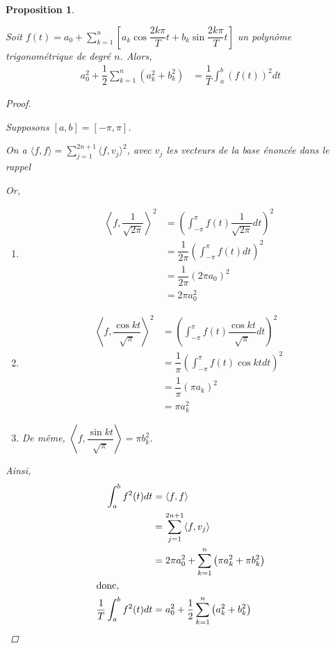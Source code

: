 \documentclass{report}
\newcommand*{\dsum}[4]{\displaystyle\sum_{#1=#2}^{#3}#4}
\newcommand*{\dint}[3]{\displaystyle\int_{#1}^{#2}#3}
\newtheorem*{prop}{Proposition}
\theoremstyle{definition}
\theoremstyle{remark}
\begin{document}
	\begin{prop}~

		Soit $f(t) = a_0 + \dsum{k}{1}{n}{\left[a_k\cos\dfrac{2k\pi}{T}t + b_k\sin\dfrac{2k\pi}{T}t\right]}$ un polyn\^ome trigonom\'etrique de degr\'e $n$. Alors,
		\begin{align*}
			a_0^2 + \dfrac{1}{2} \dsum{k}{1}{n}{\left(a_k^2+b_k^2\right)}&= \dfrac{1}{T} \dint{a}{b}{(f(t))^2 dt}
		\end{align*}
		\begin{proof}~

			Supposons $[a,b]=[-\pi,\pi]$.

			On a $\langle f,f \rangle = \dsum{j}{1}{2n+1}{\langle f, v_j \rangle^2}$, avec $v_j$ les vecteurs de la base \'enonc\'ee dans le rappel

			Or,
			\begin{enumerate}[label=\alph*)]
				\item
				\begin{align*}
					\left\langle f,\dfrac{1}{\sqrt{2\pi}} \right\rangle^2&= \left(\dint{-\pi}{\pi}{f(t) \dfrac{1}{\sqrt{2\pi}} dt}\right)^2\\
					&= \dfrac{1}{2\pi} \left(\dint{-\pi}{\pi}{f(t) dt}\right)^2\\
					&= \dfrac{1}{2\pi} (2\pi a_0)^2\\
					&= 2\pi a_0^2
				\end{align*}
				\item
				\begin{align*}
					\left\langle f, \dfrac{\cos kt}{\sqrt{\pi}} \right\rangle^2&= \left(\dint{-\pi}{\pi}{f(t) \dfrac{\cos kt}{\sqrt{\pi}} dt}\right)^2\\
					&= \dfrac{1}{\pi} \left(\dint{-\pi}{\pi}{f(t) \cos kt dt}\right)^2\\
					&= \dfrac{1}{\pi} (\pi a_k)^2\\
					&= \pi a_k^2
				\end{align*}
				\item De m\^eme, $\left\langle f, \dfrac{\sin kt}{\sqrt{\pi}} \right\rangle = \pi b_k^2$.
			\end{enumerate}

			Ainsi,
			\begin{align*}
				\dint{a}{b}{f^2(t) dt}&= \langle f,f \rangle\\
				&= \dsum{j}{1}{2n+1}{\langle f,v_j \rangle}\\
				&= 2\pi a_0^2 + \dsum{k}{1}{n}{\left(\pi a_k^2 + \pi b_k^2\right)}\\
				\intertext{donc,}
				\dfrac{1}{T} \dint{a}{b}{f^2(t) dt}&= a_0^2 + \dfrac{1}{2} \dsum{k}{1}{n}{\left( a_k^2 + b_k^2 \right)}
			\end{align*}
		\end{proof}
	\end{prop}
\end{document}
